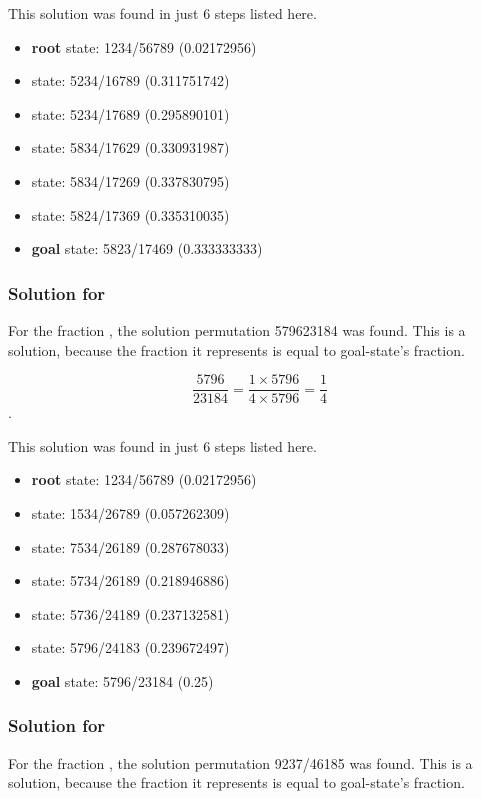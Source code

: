 \documentclass{article}
\begin{document}
This solution was found in just 6 steps listed here.

\begin{itemize}
  \item \textbf{root} state: 1234/56789 (0.02172956) 
  \item state: 5234/16789 (0.311751742)
  \item state: 5234/17689 (0.295890101)
  \item state: 5834/17629 (0.330931987)
  \item state: 5834/17269 (0.337830795)
  \item state: 5824/17369 (0.335310035)
  \item \textbf{goal} state: 5823/17469 (0.333333333)
\end{itemize}

\subsubsection{Solution for }

For the fraction , the solution permutation 579623184 was
found. This is a solution, because the fraction it represents is equal to
goal-state's fraction.

\[\frac{5796}{23184} = \frac{1 \times 5796}{4 \times 5796}
= \frac{1}{4}\].

This solution was found in just 6 steps listed here.

\begin{itemize}
  \item \textbf{root} state: 1234/56789 (0.02172956) 
  \item state: 1534/26789 (0.057262309)
  \item state: 7534/26189 (0.287678033)
  \item state: 5734/26189 (0.218946886)
  \item state: 5736/24189 (0.237132581)
  \item state: 5796/24183 (0.239672497)
  \item \textbf{goal} state: 5796/23184 (0.25)
\end{itemize}

\subsubsection{Solution for }

For the fraction , the solution permutation 9237/46185 was
found. This is a solution, because the fraction it represents is equal to
goal-state's fraction.
\end{document}
